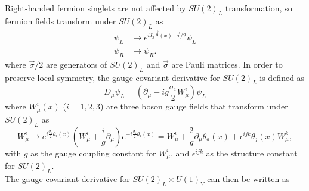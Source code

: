 \documentclass[../thesis.tex]{subfiles}
\begin{document}
Right-handed fermion singlets are not affected by $SU(2)_L$ transformation, so fermion fields transform under $SU(2)_L$ as
\begin{equation}
\begin{aligned}
\psi_L &\rightarrow e^{iI_3 \vec{\theta}(x)\cdot\vec{\sigma}/2} \psi_L \\
\psi_R &\rightarrow \psi_R.
\end{aligned}
\end{equation}
where $\vec{\sigma}/2$ are generators of $SU(2)_L$ and $\vec{\sigma}$ are Pauli matrices. In order to preserve local symmetry, the gauge covariant derivative for $SU(2)_L$ is defined as
\begin{equation}
D_\mu \psi_L = \left( \partial_\mu - ig\frac{\sigma_i}{2}W_\mu^i \right) \psi_L
\end{equation}
where $W_\mu^i (x)$ ($i=1,2,3$) are three boson gauge fields that transform under $SU(2)_L$ as
\begin{equation}
W_\mu^i \rightarrow e^{i\displaystyle\frac{\sigma_i}{2}\theta_i(x)} \left( W_\mu^i+\frac{i}{g}\partial_\mu \right) e^{-i\displaystyle\frac{\sigma_i}{2}\theta_i(x)}
= W_\mu^i + \frac{2}{g}\partial_\mu \theta_a(x) + \epsilon^{ijk}\theta_j(x) W_\mu^k,
\end{equation}
with $g$ as the gauge coupling constant for $W^i_\mu$, and $\epsilon^{ijk}$ as the structure constant for $SU(2)_L$.\\
The gauge covariant derivative for $SU(2)_L \times U(1)_Y$ can then be written as
\end{document}
